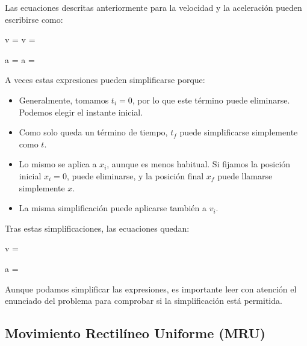 Las ecuaciones descritas anteriormente para la velocidad y la aceleración pueden escribirse como:
\begin{centeredequation}
    v =  \longrightarrow v = 
\end{centeredequation}
\begin{centeredequation}
    a =  \longrightarrow a = 
\end{centeredequation}
A veces estas expresiones pueden simplificarse porque:
\begin{itemize}
    \item Generalmente, tomamos \( t_i = 0 \), por lo que este término puede eliminarse.
    Podemos elegir el instante inicial.
    \item Como solo queda un término de tiempo, \( t_f \) puede simplificarse simplemente como \( t \).
    \item Lo mismo se aplica a \( x_i \), aunque es menos habitual.
    Si fijamos la posición inicial \( x_i = 0 \), puede eliminarse, y la posición final \( x_f \) puede llamarse simplemente \( x \).
    \item La misma simplificación puede aplicarse también a \( v_i \).
\end{itemize}
Tras estas simplificaciones, las ecuaciones quedan:
\begin{centeredequation}
    v = 
\end{centeredequation}
\begin{centeredequation}
    a = 
\end{centeredequation}
\begin{remark}
    Aunque podamos simplificar las expresiones, es importante leer con atención el enunciado del problema para comprobar si la simplificación está permitida.
\end{remark}

\subsection{Movimiento Rectilíneo Uniforme (MRU)}

